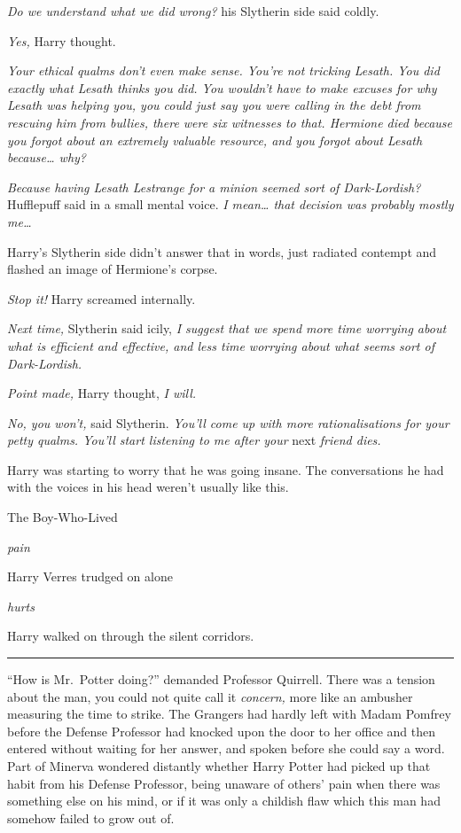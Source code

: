 \emph{Do we understand what we did wrong?} his Slytherin side said
coldly.

\emph{Yes,} Harry thought.

\emph{Your ethical qualms don't even make sense. You're not tricking
Lesath. You did exactly what Lesath thinks you did. You wouldn't have to
make excuses for why Lesath was helping you, you could just say you were
calling in the debt from rescuing him from bullies, there were six
witnesses to that. Hermione died because you forgot about an extremely
valuable resource, and you forgot about Lesath because\ldots{} why?}

\emph{Because having Lesath Lestrange for a minion seemed sort of
Dark-Lordish?} Hufflepuff said in a small mental voice. \emph{I
mean\ldots{} that decision was probably mostly me\ldots{}}

Harry's Slytherin side didn't answer that in words, just radiated
contempt and flashed an image of Hermione's corpse.

\emph{Stop it!} Harry screamed internally.

\emph{Next time,} Slytherin said icily, \emph{I suggest that we spend
more time worrying about what is efficient and effective, and less time
worrying about what seems sort of Dark-Lordish.}

\emph{Point made,} Harry thought, \emph{I will.}

\emph{No, you won't,} said Slytherin. \emph{You'll come up with more
rationalisations for your petty qualms. You'll start listening to me
after your} next \emph{friend dies.}

Harry was starting to worry that he was going insane. The conversations
he had with the voices in his head weren't usually like this.

The Boy-Who-Lived

\emph{pain}

Harry Verres trudged on alone

\emph{hurts}

Harry walked on through the silent corridors.

\begin{center}\rule{3in}{0.4pt}\end{center}

``How is Mr.~Potter doing?'' demanded Professor Quirrell. There was a
tension about the man, you could not quite call it \emph{concern,} more
like an ambusher measuring the time to strike. The Grangers had hardly
left with Madam Pomfrey before the Defense Professor had knocked upon
the door to her office and then entered without waiting for her answer,
and spoken before she could say a word. Part of Minerva wondered
distantly whether Harry Potter had picked up that habit from his Defense
Professor, being unaware of others' pain when there was something else
on his mind, or if it was only a childish flaw which this man had
somehow failed to grow out of.

